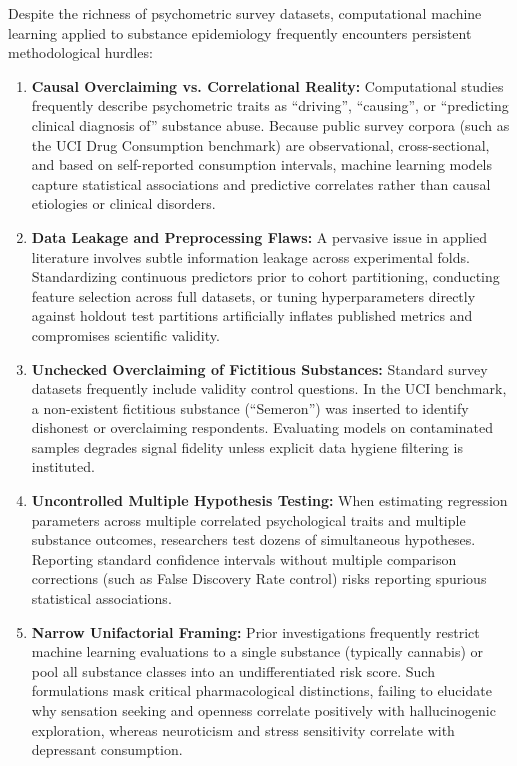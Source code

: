 \documentclass[conference]{IEEEtran}
\begin{document}
Despite the richness of psychometric survey datasets, computational machine learning applied to substance epidemiology frequently encounters persistent methodological hurdles:
\begin{enumerate}
    \item \textbf{Causal Overclaiming vs. Correlational Reality:} Computational studies frequently describe psychometric traits as ``driving'', ``causing'', or ``predicting clinical diagnosis of'' substance abuse. Because public survey corpora (such as the UCI Drug Consumption benchmark) are observational, cross-sectional, and based on self-reported consumption intervals, machine learning models capture statistical associations and predictive correlates rather than causal etiologies or clinical disorders.
    \item \textbf{Data Leakage and Preprocessing Flaws:} A pervasive issue in applied literature involves subtle information leakage across experimental folds. Standardizing continuous predictors prior to cohort partitioning, conducting feature selection across full datasets, or tuning hyperparameters directly against holdout test partitions artificially inflates published metrics and compromises scientific validity.
    \item \textbf{Unchecked Overclaiming of Fictitious Substances:} Standard survey datasets frequently include validity control questions. In the UCI benchmark, a non-existent fictitious substance (``Semeron'') was inserted to identify dishonest or overclaiming respondents. Evaluating models on contaminated samples degrades signal fidelity unless explicit data hygiene filtering is instituted.
    \item \textbf{Uncontrolled Multiple Hypothesis Testing:} When estimating regression parameters across multiple correlated psychological traits and multiple substance outcomes, researchers test dozens of simultaneous hypotheses. Reporting standard confidence intervals without multiple comparison corrections (such as False Discovery Rate control) risks reporting spurious statistical associations.
    \item \textbf{Narrow Unifactorial Framing:} Prior investigations frequently restrict machine learning evaluations to a single substance (typically cannabis) or pool all substance classes into an undifferentiated risk score. Such formulations mask critical pharmacological distinctions, failing to elucidate why sensation seeking and openness correlate positively with hallucinogenic exploration, whereas neuroticism and stress sensitivity correlate with depressant consumption.
\end{enumerate}
\end{document}
